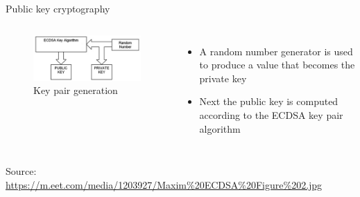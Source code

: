 \documentclass[11pt]{beamer}
\begin{document}

\begin{frame}{Public key cryptography}
	\begin{columns}
		\begin{figure}[]
			\centering
			\includegraphics  [scale=0.4]{Images/ECDSA3}
			\caption{Key pair generation}
		\end{figure}
		\begin{itemize}
			\item A random number generator is used to produce a value that becomes the private key
			\item Next the public key is computed according to the ECDSA key pair algorithm
		\end{itemize}
	\end{columns}
	\begin{tiny}
		Source: \href{https://eng.paxos.com/blockchain-separating-hype-from-substance-part-2}{https://m.eet.com/media/1203927/Maxim\%20ECDSA\%20Figure\%202.jpg}
	\end{tiny}
\end{frame}


\end{document}

